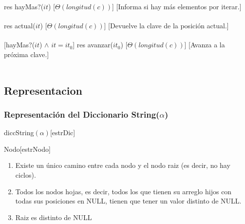   {res \igobs hayMas?($it$)}%
  [$\Theta(longitud(c))$] %
  [Informa si hay m\'as elementos por iterar.]\\\\

  {res \igobs actual($it$)}
  [$\Theta(longitud(c))$]%
  [Devuelve la clave de la posici\'on actual.]\\\\

  [hayMas?($it$) $\land$ $it = it_{0}$] %
  {res \igobs avanzar($it_{0}$)}
  [$\Theta(longitud(c))$]%
  [Avanza a la pr\'oxima clave.]\\\\


\subsection{Representacion}
  
  \subsubsection{Representaci\'on del Diccionario String($\alpha$)}
  \begin{Estructura}{diccString$(\alpha)$}[estrDic]
    \begin{Tupla}[estrDic]
    \end{Tupla}
\end{Estructura}

  \begin{Estructura}{Nodo}[estrNodo]
    \begin{Tupla}[estrNodo]
    \end{Tupla}
\end{Estructura}


\renewcommand{\labelenumi}{(\Roman{enumi})}
 \begin{enumerate}
 	\item Existe un \'unico camino entre cada nodo y el nodo raiz (es decir, no hay ciclos).
 	\item Todos los nodos hojas, es decir, todos los que tienen su arreglo hijos con todas sus posiciones en NULL, tienen que tener un valor distinto de NULL.
 	\item Raiz es distinto de NULL
  \end{enumerate}

